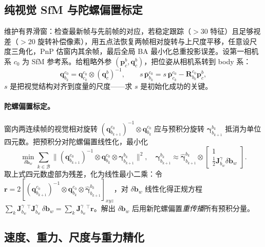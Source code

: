 \subsection{纯视觉 SfM 与陀螺偏置标定}
\label{sec:vio-init-sfm}

维护有界滑窗：检查最新帧与先前帧的对应，若稳定跟踪（$>30$ 特征）且足够视差（$>20$ 旋转补偿像素），用五点法恢复两帧相对旋转与上尺度平移，任意设尺度三角化，PnP 估窗内其余帧，最后全局 BA 最小化总重投影误差。设第一相机系 $c_0$ 为 SfM 参考系。给粗略外参 $(\mathbf{p}^b_c,\mathbf{q}^b_c)$，把位姿从相机系转到 body 系：
\begin{equation}
  \mathbf{q}^{c_0}_{b_k}=\mathbf{q}^{c_0}_{c_k}\otimes(\mathbf{q}^b_c)^{-1},
  \qquad
  s\,\bar{\mathbf{p}}^{c_0}_{b_k}=s\,\bar{\mathbf{p}}^{c_0}_{c_k}-\mathbf{R}^{c_0}_{b_k}\mathbf{p}^b_c,
  \label{eq:vio-init-cam2body}
\end{equation}
$s$ 是把视觉结构对齐到度量的尺度——求 $s$ 是初始化成功的关键。

\paragraph{陀螺偏置标定。}
窗内两连续帧的视觉相对旋转 $(\mathbf{q}^{c_0}_{b_{k+1}})^{-1}\otimes\mathbf{q}^{c_0}_{b_k}$ 应与预积分旋转 $\boldsymbol{\gamma}^{b_k}_{b_{k+1}}$ 抵消为单位四元数。把预积分对陀螺偏置线性化，最小化
\begin{equation}
  \min_{\delta\mathbf{b}_w}\sum_{k\in\mathcal{B}}\big\|(\mathbf{q}^{c_0}_{b_{k+1}})^{-1}\otimes\mathbf{q}^{c_0}_{b_k}\otimes\boldsymbol{\gamma}^{b_k}_{b_{k+1}}\big\|^2,
  \quad
  \boldsymbol{\gamma}^{b_k}_{b_{k+1}}\approx\hat{\boldsymbol{\gamma}}^{b_k}_{b_{k+1}}\otimes\begin{bmatrix}1\\ \tfrac12\mathbf{J}^\gamma_{b_w}\delta\mathbf{b}_w\end{bmatrix}.
  \label{eq:vio-init-gyro}
\end{equation}
取上式四元数虚部为残差，化为线性最小二乘：令 $\mathbf{r}=2[(\mathbf{q}^{c_0}_{b_{k+1}})^{-1}\otimes\mathbf{q}^{c_0}_{b_k}\otimes\hat{\boldsymbol{\gamma}}^{b_k}_{b_{k+1}}]_{xyz}$，对 $\delta\mathbf{b}_w$ 线性化得正规方程 $\sum_k\mathbf{J}^\gamma_{b_w}{}^\top\mathbf{J}^\gamma_{b_w}\,\delta\mathbf{b}_w=\sum_k\mathbf{J}^\gamma_{b_w}{}^\top\mathbf{r}$。\;解出 $\delta\mathbf{b}_w$ 后用新陀螺偏置\emph{重传播}所有预积分量。

\subsection{速度、重力、尺度与重力精化}
\label{sec:vio-init-vgs}

